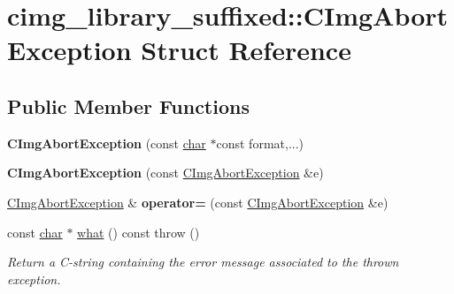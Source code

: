 \hypertarget{structcimg__library__suffixed_1_1CImgAbortException}{}\section{cimg\+\_\+library\+\_\+suffixed\+:\+:C\+Img\+Abort\+Exception Struct Reference}
\label{structcimg__library__suffixed_1_1CImgAbortException}
\subsection*{Public Member Functions}
\begin{DoxyCompactItemize}
\item 
\mbox{\label{structcimg__library__suffixed_1_1CImgAbortException_adf8705e3e9e3661bcc0dcfe866cbee38}} 
{\bfseries C\+Img\+Abort\+Exception} (const \hyperlink{classchar}{char} $\ast$const format,...)
\item 
\mbox{\label{structcimg__library__suffixed_1_1CImgAbortException_aa8334f5c924b193a348785764bc1e0ec}} 
{\bfseries C\+Img\+Abort\+Exception} (const \hyperlink{structcimg__library__suffixed_1_1CImgAbortException}{C\+Img\+Abort\+Exception} \&e)
\item 
\mbox{\label{structcimg__library__suffixed_1_1CImgAbortException_ac2c260f782c687b4edd9517666186e35}} 
\hyperlink{structcimg__library__suffixed_1_1CImgAbortException}{C\+Img\+Abort\+Exception} \& {\bfseries operator=} (const \hyperlink{structcimg__library__suffixed_1_1CImgAbortException}{C\+Img\+Abort\+Exception} \&e)
\item 
\mbox{\label{structcimg__library__suffixed_1_1CImgAbortException_af7cb17b05e7948bfdfb391f114a581f8}} 
const \hyperlink{classchar}{char} $\ast$ \hyperlink{structcimg__library__suffixed_1_1CImgAbortException_af7cb17b05e7948bfdfb391f114a581f8}{what} () const  throw ()
\begin{DoxyCompactList}\small\item\em Return a C-\/string containing the error message associated to the thrown exception. \end{DoxyCompactList}\end{DoxyCompactItemize}

